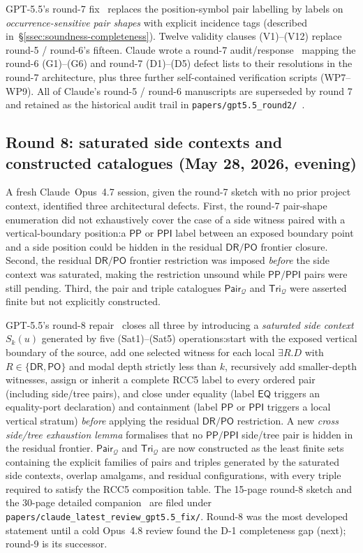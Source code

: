 \documentclass[
]{ceurart}
\theoremstyle{definition}
\newcommand{\DR}{\ensuremath{\mathsf{DR}}}
\newcommand{\PO}{\ensuremath{\mathsf{PO}}}
\newcommand{\EQ}{\ensuremath{\mathsf{EQ}}}
\newcommand{\PP}{\ensuremath{\mathsf{PP}}}
\newcommand{\PPI}{\ensuremath{\mathsf{PPI}}}
\newcommand{\Q}{\ensuremath{\mathcal Q}}
\newcommand{\Pair}{\ensuremath{\mathsf{Pair}}}
\newcommand{\Tri}{\ensuremath{\mathsf{Tri}}}
\begin{document}
GPT-5.5's round-7 fix~\cite{GPT55Round7Sketch} replaces the
position-symbol pair labelling by labels on
\emph{occurrence-sensitive pair shapes} with explicit incidence
tags (described in~\S\ref{ssec:soundness-completeness}).
Twelve validity clauses (V1)--(V12) replace round-5 / round-6's
fifteen.  Claude wrote a round-7
audit/response~\cite{ClaudeRound7Audit} mapping the round-6
(G1)--(G6) and round-7 (D1)--(D5) defect lists to their
resolutions in the round-7 architecture, plus three further
self-contained verification scripts (WP7--WP9).  All of Claude's
round-5 / round-6 manuscripts are superseded by round 7 and
retained as the historical audit trail in
\texttt{papers/gpt5.5\_round2/}~\cite{ALCIRCC5Outdated}.

\subsection{Round 8: saturated side contexts and constructed
catalogues (May 28, 2026, evening)}

A fresh Claude~Opus~4.7 session, given the round-7 sketch with no
prior project context, identified three architectural defects.
First, the round-7 pair-shape enumeration did not exhaustively
cover the case of a side witness paired with a vertical-boundary
position:\@ a $\PP$ or $\PPI$ label between an exposed boundary
point and a side position could be hidden in the residual
$\DR/\PO$ frontier closure.  Second, the residual $\DR/\PO$
frontier restriction was imposed \emph{before} the side context
was saturated, making the restriction unsound while $\PP/\PPI$
pairs were still pending.  Third, the pair and triple catalogues
$\Pair_\Q$ and $\Tri_\Q$ were asserted finite but not explicitly
constructed.

GPT-5.5's round-8 repair~\cite{GPT55Round8Sketch} closes all
three by introducing a \emph{saturated side context} $S_k(u)$
generated by five (Sat1)--(Sat5) operations:\@ start with the
exposed vertical boundary of the source, add one selected witness
for each local $\exists R.D$ with $R\in\{\DR,\PO\}$ and modal
depth strictly less than $k$, recursively add smaller-depth
witnesses, assign or inherit a complete RCC5 label to every
ordered pair (including side/tree pairs), and close under
equality (label $\EQ$ triggers an equality-port declaration) and
containment (label $\PP$ or $\PPI$ triggers a local vertical
stratum) \emph{before} applying the residual $\DR/\PO$
restriction.  A new \emph{cross side/tree exhaustion lemma}
formalises that no $\PP/\PPI$ side/tree pair is hidden in the
residual frontier.  $\Pair_\Q$ and $\Tri_\Q$ are now constructed
as the least finite sets containing the explicit families of
pairs and triples generated by the saturated side contexts,
overlap amalgams, and residual configurations, with every triple
required to satisfy the RCC5 composition table.  The 15-page
round-8 sketch and the 30-page detailed
companion~\cite{GPT55Round8Expanded} are filed under
\texttt{papers/claude\_latest\_review\_gpt5.5\_fix/}.  Round-8 was
the most developed statement until a cold Opus~4.8 review found the
D-1 completeness gap (next); round-9 is its successor.
\end{document}
